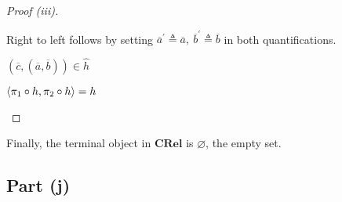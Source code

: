 \begin{prop}
\begin{proof}[Proof (iii)]
\begin{itemize}
      \step
        Right to left follows by setting $\overline{a}^\prime\triangleq\overline{a},~\overline{b}^\prime\triangleq\overline{b}$ in both quantifications.

      \step[\iffs]
        $(\overline{c},(\overline{a},\overline{b}))\in\widehat{h}$
      \addtolength{\itemsep}{-.5\baselineskip}

      \step[\iffs]
        $\langle\pi_1\circ h,\pi_2\circ h\rangle = h$
        \qedhere
    \end{itemize}
  \end{proof}
\end{prop}

Finally, the terminal object in $\mathbf{CRel}$ is $\varnothing$, the empty set.

\subsection{Part (j)}\label{sec:q-2-j}

